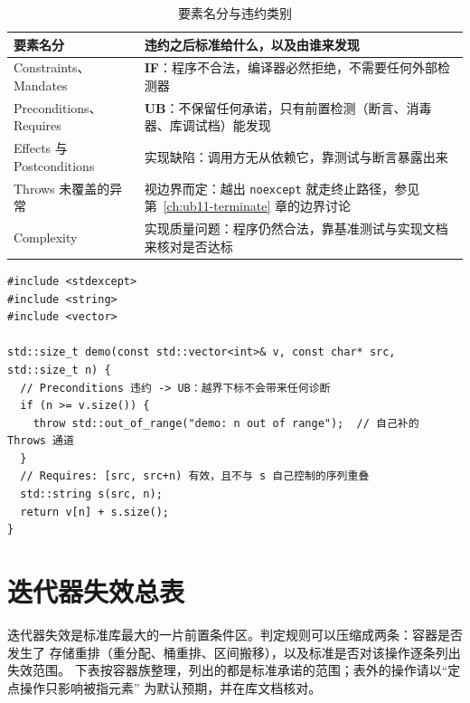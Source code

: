\documentclass[12pt,a4paper,fontset=fandol]{ctexbook}
\newcommand{\Tp}[1]{\texttt{#1}}
\newcommand{\UB}{\textbf{\textsf{UB}}}
\newcommand{\ILLF}{\textbf{\textsf{IF}}}
\begin{document}
\begin{table}
\centering
\begin{tabularx}{0.78\textwidth}{>{\raggedright\arraybackslash}p{} X}
\toprule
要素名分 & 违约之后标准给什么，以及由谁来发现 \\
\midrule
Constraints、Mandates & \ILLF{}：程序不合法，编译器必然拒绝，不需要任何外部检测器 \\
Preconditions、Requires & \UB{}：不保留任何承诺，只有前置检测（断言、消毒器、库调试档）能发现 \\
Effects 与 Postconditions & 实现缺陷：调用方无从依赖它，靠测试与断言暴露出来 \\
Throws 未覆盖的异常 & 视边界而定：越出 \Tp{noexcept} 就走终止路径，参见第~\ref{ch:ub11-terminate} 章的边界讨论 \\
Complexity & 实现质量问题：程序仍然合法，靠基准测试与实现文档来核对是否达标 \\
\bottomrule
\end{tabularx}
\caption{要素名分与违约类别}\label{tab:ub12-elements}
\end{table}

\begin{lstlisting}[style=cppstyle, caption={三种名分在同一段代码里的分工}]
#include <stdexcept>
#include <string>
#include <vector>

std::size_t demo(const std::vector<int>& v, const char* src, std::size_t n) {
  // Preconditions 违约 -> UB：越界下标不会带来任何诊断
  if (n >= v.size()) {
    throw std::out_of_range("demo: n out of range");  // 自己补的 Throws 通道
  }
  // Requires: [src, src+n) 有效，且不与 s 自己控制的序列重叠
  std::string s(src, n);
  return v[n] + s.size();
}
\end{lstlisting}

\section{迭代器失效总表}\label{sec:ub12-iterator-invalidation}

迭代器失效是标准库最大的一片前置条件区。判定规则可以压缩成两条：容器是否发生了
存储重排（重分配、桶重排、区间搬移），以及标准是否对该操作逐条列出失效范围。
下表按容器族整理，列出的都是标准承诺的范围；表外的操作请以“定点操作只影响被指元素”
为默认预期，并在库文档核对。
\end{document}
